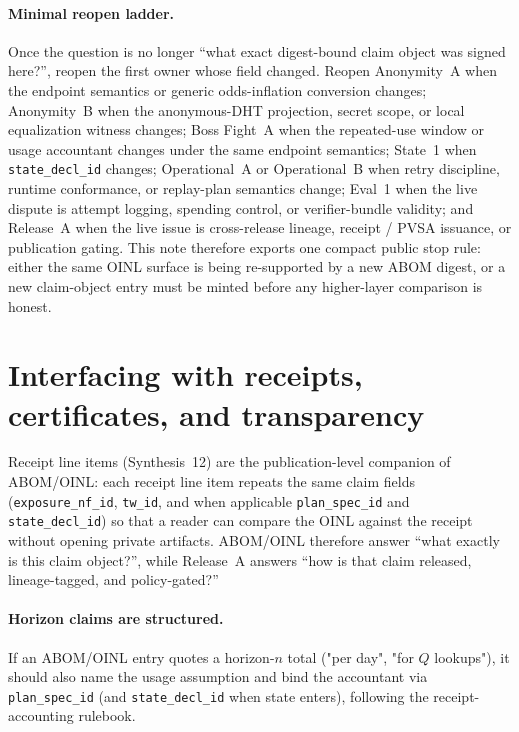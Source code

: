 \documentclass[11pt]{article}
\begin{document}
\paragraph{Minimal reopen ladder.}
Once the question is no longer ``what exact digest-bound claim object was signed here?'', reopen the first owner whose field changed. Reopen Anonymity~A when the endpoint semantics or generic odds-inflation conversion changes; Anonymity~B when the anonymous-DHT projection, secret scope, or local equalization witness changes; Boss Fight~A when the repeated-use window or usage accountant changes under the same endpoint semantics; State~1 when \texttt{state\_decl\_id} changes; Operational~A or Operational~B when retry discipline, runtime conformance, or replay-plan semantics change; Eval~1 when the live dispute is attempt logging, spending control, or verifier-bundle validity; and Release~A when the live issue is cross-release lineage, receipt / PVSA issuance, or publication gating. This note therefore exports one compact public stop rule: either the same OINL surface is being re-supported by a new ABOM digest, or a new claim-object entry must be minted before any higher-layer comparison is honest.\cite{series:bossfightA,series:profiling,series:state1,series:opretries,series:runtimeprivacy,series:evalnotary,series:releaseproperty}

\section{Interfacing with receipts, certificates, and transparency}

Receipt line items (Synthesis~12) are the publication-level companion of ABOM/OINL: each receipt line item repeats the same claim fields (\texttt{exposure\_nf\_id}, \texttt{tw\_id}, and when applicable \texttt{plan\_spec\_id} and \texttt{state\_decl\_id}) so that a reader can compare the OINL against the receipt without opening private artifacts.\cite{series:receiptitems}
ABOM/OINL therefore answer ``what exactly is this claim object?'', while Release~A answers ``how is that claim released, lineage-tagged, and policy-gated?''\cite{series:releaseproperty}

\paragraph{Horizon claims are structured.}
If an ABOM/OINL entry quotes a horizon-$n$ total ("per day", "for $Q$ lookups"), it should also name the usage assumption and bind the accountant via \texttt{plan\_spec\_id} (and \texttt{state\_decl\_id} when state enters), following the receipt-accounting rulebook.\cite{series:accountingrulebook}
\end{document}
